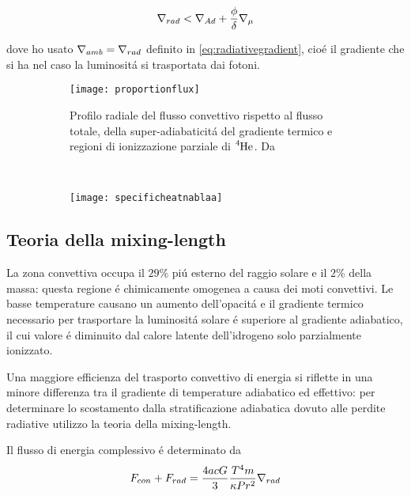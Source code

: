 \documentclass[../main.tex]{subfiles}
\begin{document}
\begin{equation}
\nabla_{rad}{}<\nabla_{Ad}+\frac{\phi}{\delta}\nabla_{\mu}{}\label{eq:ledoux}
\end{equation}

dove ho usato $\nabla_{amb}=\nabla_{rad}{}$ definito in \eqref{eq:radiativegradient}, cio\'e il gradiente che si ha nel caso la luminosit\'a si trasportata dai fotoni.

\begin{figure}[!h]
\begin{subfigure}[t]{0.6\textwidth}
    \texttt{[image: proportionflux]}
    \caption{Profilo radiale del flusso convettivo rispetto al flusso totale, della super-adiabaticit\'a del gradiente termico e regioni di ionizzazione parziale di $\cel{He}{4}{}{}$. Da \cite{gou76convection}}
    \label{fluxproportion}
\end{subfigure}
~
\begin{subfigure}[t]{0.4\textwidth}
\centering
\texttt{[image: specificheatnablaa]}
\end{subfigure}
    
\end{figure}

\subsection{Teoria della mixing-length}

La zona convettiva occupa il $29\%$ pi\'u esterno del raggio solare e il $2\%$ della massa: questa regione \'e chimicamente omogenea a causa dei moti convettivi. Le basse temperature causano un aumento dell'opacit\'a e il gradiente termico necessario per trasportare la luminosit\'a solare \'e superiore al gradiente adiabatico, il cui valore \'e diminuito dal calore latente dell'idrogeno solo parzialmente ionizzato.

Una maggiore efficienza del trasporto convettivo di energia si riflette in una minore differenza tra il gradiente di temperature adiabatico ed effettivo: per determinare lo scostamento dalla stratificazione adiabatica dovuto alle perdite radiative utilizzo la teoria della mixing-length.

Il flusso di energia complessivo \'e determinato da
\begin{equation}
F_{con}+F_{rad}=\frac{4acG}{3}\frac{T^4m}{\kappa Pr^2}\nabla_{rad}{}\label{eq:totalflux}
\end{equation}
\end{document}
